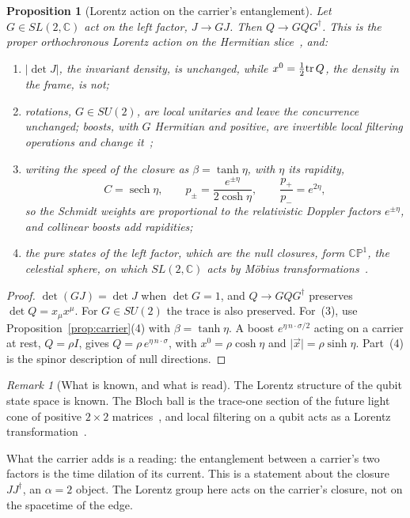 \documentclass[11pt]{amsart}
\newtheorem{proposition}[theorem]{Proposition}
\theoremstyle{definition}
\theoremstyle{remark}
\newtheorem{remark}[theorem]{Remark}
\begin{document}
\begin{proposition}[Lorentz action on the carrier's entanglement]\label{prop:lorentz}
Let $G\in SL(2,\mathbb C)$ act on the left factor, $J\to GJ$. Then $Q\to GQG^\dagger$. This is the proper orthochronous Lorentz action on the Hermitian slice~\cite[Eqs.~(35)--(36)]{Info}, and:
\begin{enumerate}
\item $\lvert\det J\rvert$, the invariant density, is unchanged, while $x^0=\tfrac12{\rm tr}\,Q$, the density in the frame, is not;
\item rotations, $G\in SU(2)$, are local unitaries and leave the concurrence unchanged; boosts, with $G$ Hermitian and positive, are invertible local filtering operations and change it~\cite{VDD};
\item writing the speed of the closure as $\beta=\tanh\eta$, with $\eta$ its rapidity,
\[
C=\operatorname{sech}\eta,\qquad p_\pm=\frac{e^{\pm\eta}}{2\cosh\eta},\qquad \frac{p_+}{p_-}=e^{2\eta},
\]
so the Schmidt weights are proportional to the relativistic Doppler factors $e^{\pm\eta}$, and collinear boosts add rapidities;
\item the pure states of the left factor, which are the null closures, form $\mathbb{CP}^1$, the celestial sphere, on which $SL(2,\mathbb C)$ acts by M\"obius transformations~\cite{PR}.
\end{enumerate}
\end{proposition}

\begin{proof}
$\det(GJ)=\det J$ when $\det G=1$, and $Q\to GQG^\dagger$ preserves $\det Q=x_\mu x^\mu$. For $G\in SU(2)$ the trace is also preserved. For~(3), use Proposition~\ref{prop:carrier}(4) with $\beta=\tanh\eta$. A boost $e^{\eta\,n\cdot\sigma/2}$ acting on a carrier at rest, $Q=\rho I$, gives $Q=\rho\,e^{\eta\,n\cdot\sigma}$, with $x^0=\rho\cosh\eta$ and $\lvert\vec x\rvert=\rho\sinh\eta$. Part~(4) is the spinor description of null directions. \end{proof}

\begin{remark}[What is known, and what is read]
The Lorentz structure of the qubit state space is known. The Bloch ball is the trace-one section of the future light cone of positive $2\times2$ matrices~\cite{SSS}, and local filtering on a qubit acts as a Lorentz transformation~\cite{VDD}.

What the carrier adds is a reading: the entanglement between a carrier's two factors is the time dilation of its current. This is a statement about the closure $JJ^\dagger$, an $\alpha=2$ object. The Lorentz group here acts on the carrier's closure, not on the spacetime of the edge.
\end{remark}
\end{document}
